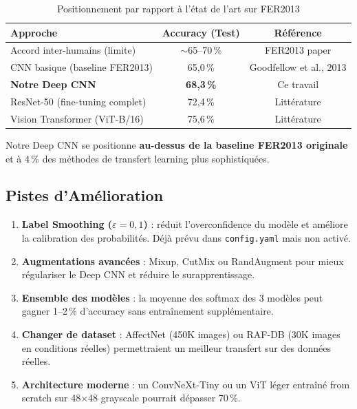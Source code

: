 \documentclass[12pt,a4paper]{article}
\begin{document}
\begin{table}[H]
  \centering
  \caption{Positionnement par rapport à l'état de l'art sur FER2013}
  \renewcommand{\arraystretch}{1.3}
  \begin{tabular}{lcc}
    \toprule
    \textbf{Approche} & \textbf{Accuracy (Test)} & \textbf{Référence} \\
    \midrule
    Accord inter-humains (limite) & $\sim$65--70\,\% & FER2013 paper \\
    CNN basique (baseline FER2013) & 65,0\,\%  & Goodfellow et al., 2013 \\
    \textbf{Notre Deep CNN}        & \textbf{68,3\,\%} & Ce travail \\
    ResNet-50 (fine-tuning complet) & 72,4\,\% & Littérature \\
    Vision Transformer (ViT-B/16)  & 75,6\,\% & Littérature \\
    \bottomrule
  \end{tabular}
  \label{tab:sota}
\end{table}

Notre Deep CNN se positionne \textbf{au-dessus de la baseline FER2013 originale}
et à 4\,\% des méthodes de transfert learning plus sophistiquées.

\subsection{Pistes d'Amélioration}

\begin{enumerate}
  \item \textbf{Label Smoothing ($\varepsilon=0{,}1$)} : réduit l'overconfidence
        du modèle et améliore la calibration des probabilités. Déjà prévu dans
        \texttt{config.yaml} mais non activé.

  \item \textbf{Augmentations avancées} : Mixup, CutMix ou RandAugment pour
        mieux régulariser le Deep CNN et réduire le surapprentissage.

  \item \textbf{Ensemble des modèles} : la moyenne des softmax des 3 modèles
        peut gagner 1--2\,\% d'accuracy sans entraînement supplémentaire.

  \item \textbf{Changer de dataset} : AffectNet (450K images) ou RAF-DB
        (30K images en conditions réelles) permettraient un meilleur
        transfert sur des données réelles.

  \item \textbf{Architecture moderne} : un ConvNeXt-Tiny ou un ViT léger
        entraîné from scratch sur 48×48 grayscale pourrait dépasser 70\,\%.
\end{enumerate}
\end{document}

